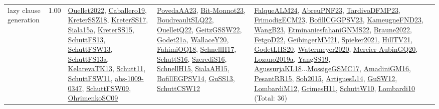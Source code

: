 {\begin{longtable}{p{3cm}r>{\raggedright\arraybackslash}p{6cm}>{\raggedright\arraybackslash}p{6cm}>{\raggedright\arraybackslash}p{8cm}}
\index{lazy clause generation}\index{Algorithms!lazy clause generation}lazy clause generation &  1.00 & \hyperref[detail:Ouellet2022]{Ouellet2022}, \hyperref[detail:Caballero19]{Caballero19}, \hyperref[detail:KreterSSZ18]{KreterSSZ18}, \hyperref[detail:KreterSS17]{KreterSS17}, \hyperref[detail:Siala15a]{Siala15a}, \hyperref[detail:KreterSS15]{KreterSS15}, \hyperref[detail:SchuttFS13]{SchuttFS13}, \hyperref[detail:SchuttFSW13]{SchuttFSW13}, \hyperref[detail:SchuttFS13a]{SchuttFS13a}, \hyperref[detail:KelarevaTK13]{KelarevaTK13}, \hyperref[detail:Schutt11]{Schutt11}, \hyperref[detail:SchuttFSW11]{SchuttFSW11}, \hyperref[detail:abs-1009-0347]{abs-1009-0347}, \hyperref[detail:SchuttFSW09]{SchuttFSW09}, \hyperref[detail:OhrimenkoSC09]{OhrimenkoSC09} & \hyperref[detail:PovedaAA23]{PovedaAA23}, \hyperref[detail:Bit-Monnot23]{Bit-Monnot23}, \hyperref[detail:BoudreaultSLQ22]{BoudreaultSLQ22}, \hyperref[detail:OuelletQ22]{OuelletQ22}, \hyperref[detail:GeitzGSSW22]{GeitzGSSW22}, \hyperref[detail:Godet21a]{Godet21a}, \hyperref[detail:WallaceY20]{WallaceY20}, \hyperref[detail:FahimiOQ18]{FahimiOQ18}, \hyperref[detail:SchnellH17]{SchnellH17}, \hyperref[detail:SchuttS16]{SchuttS16}, \hyperref[detail:SzerediS16]{SzerediS16}, \hyperref[detail:SchnellH15]{SchnellH15}, \hyperref[detail:SialaAH15]{SialaAH15}, \hyperref[detail:BofillEGPSV14]{BofillEGPSV14}, \hyperref[detail:GuSS13]{GuSS13}, \hyperref[detail:SchuttCSW12]{SchuttCSW12} & \hyperref[detail:FalqueALM24]{FalqueALM24}, \hyperref[detail:AbreuPNF23]{AbreuPNF23}, \hyperref[detail:TardivoDFMP23]{TardivoDFMP23}, \hyperref[detail:FrimodigECM23]{FrimodigECM23}, \hyperref[detail:BofillCGGPSV23]{BofillCGGPSV23}, \hyperref[detail:KameugneFND23]{KameugneFND23}, \hyperref[detail:WangB23]{WangB23}, \hyperref[detail:EtminaniesfahaniGNMS22]{EtminaniesfahaniGNMS22}, \hyperref[detail:Braune2022]{Braune2022}, \hyperref[detail:FetgoD22]{FetgoD22}, \hyperref[detail:GeibingerMM21]{GeibingerMM21}, \hyperref[detail:Spieker2021]{Spieker2021}, \hyperref[detail:HillTV21]{HillTV21}, \hyperref[detail:GodetLHS20]{GodetLHS20}, \hyperref[detail:Watermeyer2020]{Watermeyer2020}, \hyperref[detail:Mercier-AubinGQ20]{Mercier-AubinGQ20}, \hyperref[detail:Lozano2019a]{Lozano2019a}, \hyperref[detail:YangSS19]{YangSS19}, \hyperref[detail:AgussurjaKL18]{AgussurjaKL18}...\hyperref[detail:MossigeGSMC17]{MossigeGSMC17}, \hyperref[detail:AmadiniGM16]{AmadiniGM16}, \hyperref[detail:PesantRR15]{PesantRR15}, \hyperref[detail:Soh2015]{Soh2015}, \hyperref[detail:ArtiguesL14]{ArtiguesL14}, \hyperref[detail:GuSW12]{GuSW12}, \hyperref[detail:LombardiM12]{LombardiM12}, \hyperref[detail:GrimesH11]{GrimesH11}, \hyperref[detail:SchuttW10]{SchuttW10}, \hyperref[detail:Lombardi10]{Lombardi10} (Total: 36)\\

\end{longtable}}
